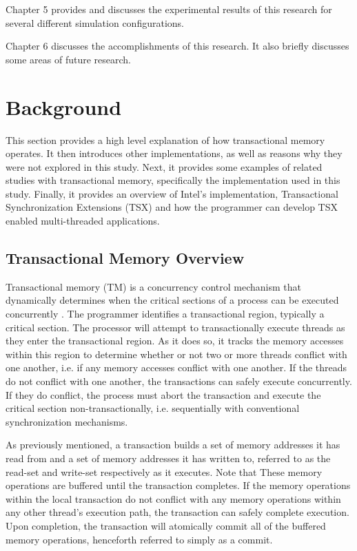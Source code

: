 \documentclass[a4paper]{article}
\begin{document}
\indent
Chapter 5 provides and discusses the experimental results of this research for
several different simulation configurations.
\par

\indent
Chapter 6 discusses the accomplishments of this research.  It also briefly
discusses some areas of future research.
\par

\newpage

\section{\textbf{Background}}

\indent 
This section provides a high level explanation of how transactional
memory operates.  It then introduces other implementations, as well as reasons
why they were not explored in this study.  Next, it provides some examples of
related studies with transactional memory, specifically the implementation used
in this study. Finally, it provides an overview of Intel's implementation,
Transactional Synchronization Extensions (TSX) and how the programmer can
develop TSX enabled multi-threaded applications.
\par

\subsection{\textbf{Transactional Memory Overview}}

\indent
Transactional memory (TM) is a concurrency control mechanism that dynamically
determines when the critical sections of a process can be executed concurrently
\cite{sle_rajwar}.  The programmer identifies a transactional region, typically
a critical section.  The processor will attempt to transactionally execute
threads as they enter the transactional region.  As it does so, it tracks the
memory accesses within this region to determine whether or not two or more
threads conflict with one another, i.e. if any memory accesses conflict with one
another.  If the threads do not conflict with one another, the transactions can
safely execute concurrently.  If they do conflict, the process must abort the
transaction and execute the critical section non-transactionally, i.e.
sequentially with conventional synchronization mechanisms. 
\par

\indent 
As previously mentioned, a transaction builds a set of memory addresses it has
read from and a set of memory addresses it has written to, referred to as the
read-set and write-set respectively \cite{intel_prog_ref} as it executes.  Note
that These memory operations are buffered until the transaction completes.  If
the  memory operations within the local transaction do not conflict with any
memory operations within any other thread's execution path, the transaction can
safely complete execution.  Upon completion, the transaction will atomically
commit all of the buffered memory operations, henceforth referred to simply as a
commit.
\par
\end{document}
